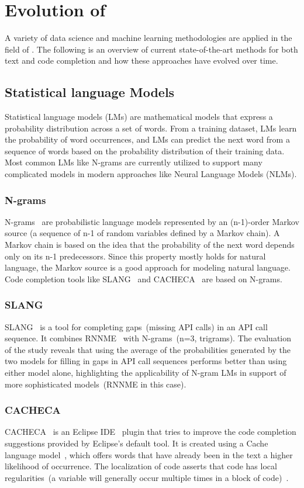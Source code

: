 \section{Evolution of \cct{}}
A variety of data science and machine learning methodologies are applied in the field of \cct{}. The following is an overview of current state-of-the-art methods for both text and code completion and how these approaches have evolved over time.

\subsection{Statistical language Models}
Statistical language models (LMs) are mathematical models that express a probability distribution across a set of words. From a training dataset, LMs learn the probability of word occurrences, and LMs can predict the next word from a sequence of words based on the probability distribution of their training data. Most common LMs like N-grams are currently utilized to support many complicated models in modern approaches like Neural Language Models (NLMs).

\subsubsection{N-grams}
N-grams~\cite{ngram} are probabilistic language models represented by an (n-1)-order Markov source (a sequence of n-1 of random variables defined by a Markov chain). A Markov chain is based on the idea that the probability of the next word depends only on its n-1 predecessors. Since this property mostly holds for natural language, the Markov source is a good approach for modeling natural language.
Code completion tools like SLANG~\cite{slang} and CACHECA~\cite{cacheca} are based on N-grams.

\subsubsection{SLANG}
SLANG~\cite{slang} is a tool for completing gaps~(missing API calls) in an API call sequence. It combines RNNME~\cite{rnnme} with N-grams~(n=3, trigrams). 
The evaluation of the study reveals that using the average of the probabilities generated by the two models for filling in gaps in API call sequences performs better than using either model alone, highlighting the applicability of N-gram LMs in support of more sophisticated models~(RNNME in this case).

\subsubsection{CACHECA}
CACHECA~\cite{cacheca} is an Eclipse IDE~\cite{eclipse} plugin that tries to improve the code completion suggestions provided by Eclipse's default tool. It is created using a Cache language model~\cite{localse}, which offers words that have already been in the text a higher likelihood of occurrence. The localization of code asserts that code has local regularities~(a variable will generally occur multiple times in a block of code)~\cite{localse}.

